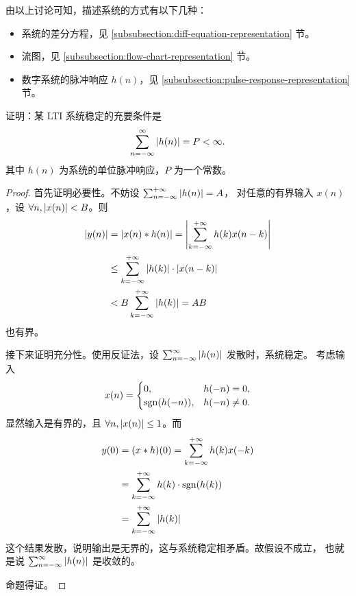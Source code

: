 \begin{remark}
    由以上讨论可知，描述系统的方式有以下几种：
    \begin{itemize}
        \item 系统的差分方程，见 \ref{subsubsection:diff-equation-representation} 节。
        \item 流图，见 \ref{subsubsection:flow-chart-representation} 节。
        \item 数字系统的脉冲响应 $h(n)$，见 \ref{subsubsection:pulse-response-representation} 节。
    \end{itemize}
\end{remark}

\begin{exercise}
    \label{exercise:LTI-stable}
    证明：某 LTI 系统稳定的充要条件是
    \begin{align*}
        \sum_{n = -\infty}^{\infty} \left|h(n)\right| = P < \infty.
    \end{align*}
    其中 $h(n)$ 为系统的单位脉冲响应，$P$ 为一个常数。
\end{exercise}

\begin{proof}
    首先证明必要性。不妨设 $\sum_{n= -\infty}^{+\infty}\left|h(n)\right| = A$，
    对任意的有界输入 $x(n)$，设 $\forall n, \left|x(n)\right| < B$。则
    \begin{align*}
        \left|y(n)\right| & = \left|x(n) * h(n)\right| = \left|\sum_{k = -\infty}^{+\infty}h(k)x(n - k)\right| \\
        & \le \sum_{k = -\infty}^{+\infty} \left|h(k)\right| \cdot \left|x(n - k)\right| \\
        & < B \sum_{k = -\infty}^{+\infty} \left|h(k)\right| = AB
    \end{align*}
    也有界。

    接下来证明充分性。使用反证法，设 $\sum_{n = -\infty}^{\infty} \left|h(n)\right|$ 发散时，系统稳定。
    考虑输入
    \begin{align*}
        x(n) = \begin{cases}
                0, & h(-n) = 0, \\
                \mathrm{sgn}(h(-n)), & h(-n) \neq 0.
            \end{cases}
    \end{align*}
    显然输入是有界的，且 $\forall n, \left|x(n)\right| \le 1$。而
    \begin{align*}
        y(0) & = (x * h)(0) = \sum_{k = -\infty}^{+\infty}h(k)x(-k) \\
        & = \sum_{k = -\infty}^{+\infty}h(k) \cdot \mathrm{sgn}(h(k)) \\
        & = \sum_{k = -\infty}^{+\infty}\left|h(k)\right|
    \end{align*}
    这个结果发散，说明输出是无界的，这与系统稳定相矛盾。故假设不成立，
    也就是说 $\sum_{n = -\infty}^{\infty} \left|h(n)\right|$ 是收敛的。

    命题得证。
\end{proof}

